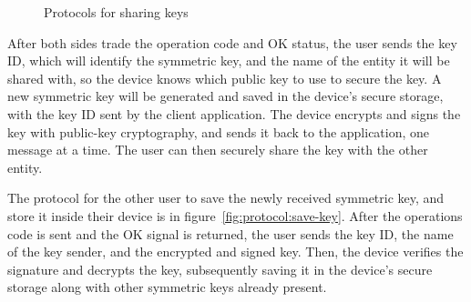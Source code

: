 \begin{figure}[h]
	\centering     %
	\caption{Protocols for sharing keys}
\end{figure}

After both sides trade the operation code and OK status, the user sends the key ID, which will identify the symmetric key, and the name of the entity it will be shared with, so the device knows which public key to use to secure the key.
A new symmetric key will be generated and saved in the device's secure storage, with the key ID sent by the client application. The device encrypts and signs the key with public-key cryptography, and sends it back to the application, one message at a time. The user can then securely share the key with the other entity.

The protocol for the other user to save the newly received symmetric key, and store it inside their device is in figure~\ref{fig:protocol:save-key}.
After the operations code is sent and the OK signal is returned, the user sends the key ID, the name of the key sender, and the encrypted and signed key.
Then, the device verifies the signature and decrypts the key, subsequently saving it in the device's secure storage along with other symmetric keys already present.
